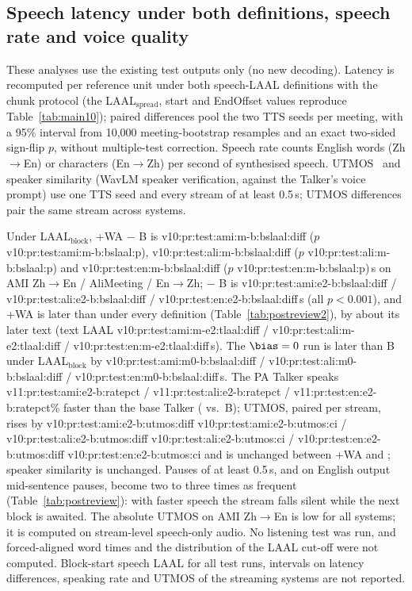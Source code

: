 \subsection{Speech latency under both definitions, speech rate and voice quality}
\label{app:postreview}

\ifPostReview
These analyses use the existing test outputs only (no new decoding). Latency is recomputed per reference unit under
both speech-LAAL definitions with the chunk protocol (the LAAL$_\text{spread}$, start and EndOffset values reproduce
Table~\ref{tab:main10}); paired differences pool the two TTS seeds per meeting, with a 95\% interval from 10{,}000
meeting-bootstrap resamples and an exact two-sided sign-flip $p$, without multiple-test correction. Speech rate counts
English words (Zh$\rightarrow$En) or characters (En$\rightarrow$Zh) per second of synthesised speech. UTMOS~\citep{saeki2022utmos}
and speaker similarity (WavLM speaker verification, against the Talker's voice prompt) use one TTS seed and every stream
of at least 0.5\,s; UTMOS differences pair the same stream across systems.

Under LAAL$_\text{block}$, \sys{}+WA $-$ B is \num{v10:pr:test:ami:m-b:bslaal:diff} ($p$ \num{v10:pr:test:ami:m-b:bslaal:p}),
\num{v10:pr:test:ali:m-b:bslaal:diff} ($p$ \num{v10:pr:test:ali:m-b:bslaal:p}) and \num{v10:pr:test:en:m-b:bslaal:diff}
($p$ \num{v10:pr:test:en:m-b:bslaal:p})\,s on AMI Zh$\rightarrow$En / AliMeeting / En$\rightarrow$Zh; \sys{} $-$ B is
\num{v10:pr:test:ami:e2-b:bslaal:diff} / \num{v10:pr:test:ali:e2-b:bslaal:diff} / \num{v10:pr:test:en:e2-b:bslaal:diff}\,s
(all $p<0.001$), and \sys{}+WA is later than \sys{} under every definition (Table~\ref{tab:postreview2}), by about its later
text (text LAAL \num{v10:pr:test:ami:m-e2:tlaal:diff} / \num{v10:pr:test:ali:m-e2:tlaal:diff} /
\num{v10:pr:test:en:m-e2:tlaal:diff}\,s). The $\bias=0$ run is later than B under LAAL$_\text{block}$ by
\num{v10:pr:test:ami:m0-b:bslaal:diff} / \num{v10:pr:test:ali:m0-b:bslaal:diff} / \num{v10:pr:test:en:m0-b:bslaal:diff}\,s.
The PA Talker speaks \num{v11:pr:test:ami:e2-b:ratepct} / \num{v11:pr:test:ali:e2-b:ratepct} /
\num{v11:pr:test:en:e2-b:ratepct}\% faster than the base Talker (\sys{} vs.\ B); UTMOS, paired per stream, rises by
\num{v10:pr:test:ami:e2-b:utmos:diff} \num{v10:pr:test:ami:e2-b:utmos:ci} / \num{v10:pr:test:ali:e2-b:utmos:diff}
\num{v10:pr:test:ali:e2-b:utmos:ci} / \num{v10:pr:test:en:e2-b:utmos:diff} \num{v10:pr:test:en:e2-b:utmos:ci} and is
unchanged between \sys{}+WA and \sys{}; speaker similarity is unchanged. Pauses of at least 0.5\,s, and on English output
mid-sentence pauses, become two to three times as frequent (Table~\ref{tab:postreview}): with faster speech the stream
falls silent while the next block is awaited. The absolute UTMOS on AMI Zh$\rightarrow$En is low for all systems; it is
computed on stream-level speech-only audio. No listening test was run, and forced-aligned word times and the
distribution of the LAAL cut-off were not computed.
\else
Block-start speech LAAL for all test runs, intervals on latency differences, speaking rate and UTMOS of the streaming
systems are not reported.
\fi

